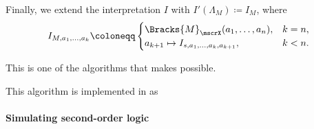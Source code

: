 \begin{algorithm}
\begin{thmenum}
     Finally, we extend the interpretation \( I \) with \( I'(\Lambda_M) \coloneqq I_M \), where
    \begin{equation*}
      I_{M,a_1,\ldots,a_k} \coloneqq \begin{cases}
        \Bracks{M}_\mscrX(a_1, \ldots, a_n),          &k = n, \\
        a_{k+1} \mapsto I_{s,a_1,\ldots,a_k,a_{k+1}}, &k < n.
      \end{cases}
    \end{equation*}
  \end{thmenum}
\end{algorithm}
\begin{comments}
  \item This is one of the algorithms that makes  possible.
  \item This algorithm is implemented in \cite{notebook:code} as
  \begin{CodeRefDisplay}
  \end{CodeRefDisplay}
\end{comments}

\paragraph{Simulating second-order logic}

